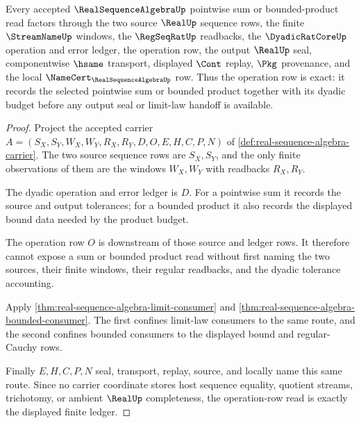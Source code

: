 \begin{theorem}\label{thm:real-sequence-algebra-operation-row-exactness}
Every accepted $\RealSequenceAlgebraUp$ pointwise sum or bounded-product read
factors through the two source $\RealUp$ sequence rows, the finite
$\StreamNameUp$ windows, the $\RegSeqRatUp$ readbacks, the
$\DyadicRatCoreUp$ operation and error ledger, the operation row, the output
$\RealUp$ seal, componentwise $\hsame$ transport, displayed $\Cont$ replay,
$\Pkg$ provenance, and the local $\NameCert_{\RealSequenceAlgebraUp}$ row.
Thus the operation row is exact: it records the selected pointwise sum or
bounded product together with its dyadic budget before any output seal or
limit-law handoff is available.
\end{theorem}
\begin{proof}
Project the accepted carrier
$A=(S_X,S_Y,W_X,W_Y,R_X,R_Y,D,O,E,H,C,P,N)$ of
\autoref{def:real-sequence-algebra-carrier}. The two source sequence rows are
$S_X,S_Y$, and the only finite observations of them are the windows
$W_X,W_Y$ with readbacks $R_X,R_Y$.

The dyadic operation and error ledger is $D$. For a pointwise sum it records
the source and output tolerances; for a bounded product it also records the
displayed bound data needed by the product budget.

The operation row $O$ is downstream of those source and ledger rows. It
therefore cannot expose a sum or bounded product read without first naming
the two sources, their finite windows, their regular readbacks, and the
dyadic tolerance accounting.

Apply \autoref{thm:real-sequence-algebra-limit-consumer} and
\autoref{thm:real-sequence-algebra-bounded-consumer}. The first confines
limit-law consumers to the same route, and the second confines bounded
consumers to the displayed bound and regular-Cauchy rows.

Finally $E,H,C,P,N$ seal, transport, replay, source, and locally name this
same route. Since no carrier coordinate stores host sequence equality,
quotient streams, trichotomy, or ambient $\RealUp$ completeness, the
operation-row read is exactly the displayed finite ledger.
\end{proof}

